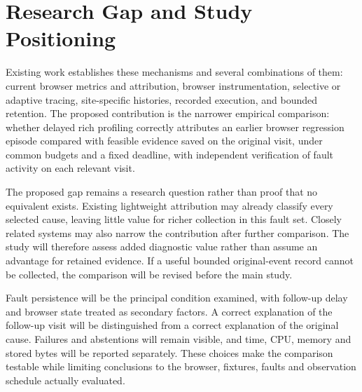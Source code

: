 \section{Research Gap and Study Positioning}

Existing work establishes these mechanisms and several combinations of them: current browser metrics and attribution, browser instrumentation, selective or adaptive tracing, site-specific histories, recorded execution, and bounded retention. The proposed contribution is the narrower empirical comparison: whether delayed rich profiling correctly attributes an earlier browser regression episode compared with feasible evidence saved on the original visit, under common budgets and a fixed deadline, with independent verification of fault activity on each relevant visit.

The proposed gap remains a research question rather than proof that no equivalent exists. Existing lightweight attribution may already classify every selected cause, leaving little value for richer collection in this fault set. Closely related systems may also narrow the contribution after further comparison. The study will therefore assess added diagnostic value rather than assume an advantage for retained evidence. If a useful bounded original-event record cannot be collected, the comparison will be revised before the main study.

Fault persistence will be the principal condition examined, with follow-up delay and browser state treated as secondary factors. A correct explanation of the follow-up visit will be distinguished from a correct explanation of the original cause. Failures and abstentions will remain visible, and time, CPU, memory and stored bytes will be reported separately. These choices make the comparison testable while limiting conclusions to the browser, fixtures, faults and observation schedule actually evaluated.
